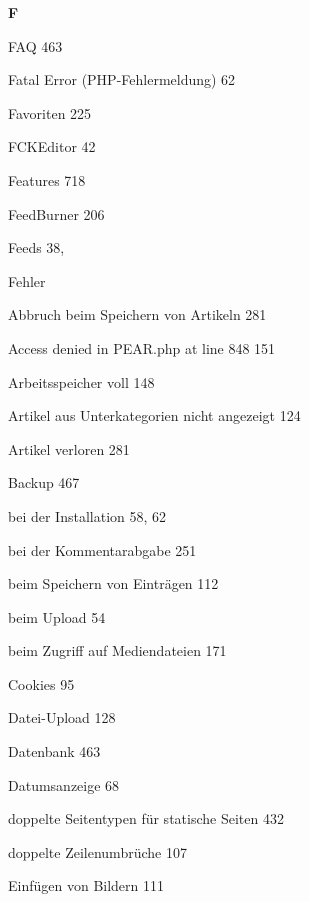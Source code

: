 \documentclass{book}
\renewcommand\indexspace{\vspace{11pt}}
\renewcommand\subitem{\par}
\begin{document}
\begin{multicols}{2}
\begin{osp-index}
  \indexspace
{\sffamily\bfseries F}\nopagebreak

  \item FAQ\hspace{1mm} 463
  \item Fatal Error (PHP-Fehlermeldung)\hspace{1mm} 62
  \item Favoriten\hspace{1mm} 225
  \item FCKEditor\hspace{1mm} 42
  \item Features\hspace{1mm} 718
  \item FeedBurner\hspace{1mm} 206
  \item Feeds\hspace{1mm} 38, 
  \item Fehler
    \subitem Abbruch beim Speichern von Artikeln\hspace{1mm} 281
    \subitem Access denied in PEAR.php at line 848\hspace{1mm} 151
    \subitem Arbeitsspeicher voll\hspace{1mm} 148
    \subitem Artikel aus Unterkategorien nicht angezeigt\hspace{1mm} 
		124
    \subitem Artikel verloren\hspace{1mm} 281
    \subitem Backup\hspace{1mm} 467
    \subitem bei der Installation\hspace{1mm} 58, 62
    \subitem bei der Kommentarabgabe\hspace{1mm} 251
    \subitem beim Speichern von Eintr\"agen\hspace{1mm} 112
    \subitem beim Upload\hspace{1mm} 54
    \subitem beim Zugriff auf Mediendateien\hspace{1mm} 171
    \subitem Cookies\hspace{1mm} 95
    \subitem Datei-Upload\hspace{1mm} 128
    \subitem Datenbank\hspace{1mm} 463
    \subitem Datumsanzeige\hspace{1mm} 68
    \subitem doppelte Seitentypen f\"ur statische Seiten\hspace{1mm} 
		432
    \subitem doppelte Zeilenumbr\"uche\hspace{1mm} 107
    \subitem Einf\"ugen von Bildern\hspace{1mm} 111

\end{osp-index}
\end{multicols}
\end{document}
